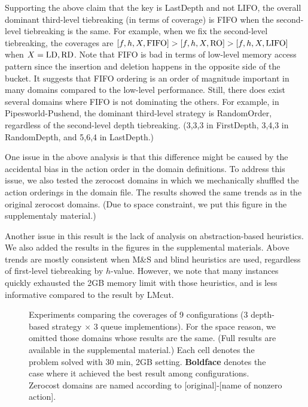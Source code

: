 Supporting the above claim that the key is LastDepth and not LIFO, the
overall dominant third-level tiebreaking (in terms of coverage) is FIFO
when the second-level tiebreaking is the same.  For example, when we fix
the second-level tiebreaking, the coverages are
$[f,h,X,\mbox{FIFO}]>[f,h,X,\mbox{RO}]>[f,h,X,\mbox{LIFO}]$ when $X=\mbox{LD},\mbox{RD}$.
% 
Note that FIFO is bad in terms of low-level memory access
pattern since the insertion and deletion happens in the opposite side of
the bucket. It suggests that FIFO ordering is an order of magnitude
important in many domains compared to the low-level performance.
% 
Still, there does exist several domains where FIFO is not dominating
the others.
For example, in Pipesworld-Pushend, the dominant third-level strategy is
RandomOrder, regardless of the second-level depth tiebreaking.
(3,3,3 in FirstDepth, 3,4,3 in RandomDepth, and 5,6,4 in LastDepth.)

% 

One issue in the above analysis is that this difference might
be caused by the accidental bias in the action order in the
domain definitions.
To address this issue, we also tested the zerocost domains
in which we mechanically shuffled the action orderings in the
domain file. The results showed the same trends as in the original
zerocost domains. (Due to space constraint, we put this figure in the
supplementaly material.)

Another issue in this result is the lack of analysis on
abstraction-based heuristics. We also added the results in the figures
in the supplemental materials. Above trends are mostly consistent when
M\&S and blind heuristics are used, regardless of first-level
tiebreaking by $h$-value. However, we note that many instances quickly
exhausted the 2GB memory limit with those heuristics, and is less
informative compared to the result by LMcut.

\begin{figure}[htb]
 \centering
 
 \caption{Experiments
 comparing the coverages of 9 configurations (3 depth-based strategy
 $\times$ 3 queue implementions). For the space reason, we omitted those
 domains whose results are the same. (Full results are available in the
 supplemental material.) Each cell denotes the problem solved with 30
 min, 2GB setting. \textbf{Boldface} denotes the case where it achieved
 the best result among configurations. Zerocost domains are named
 according to [original]-[name of nonzero action].}
 \label{depth}
\end{figure}

